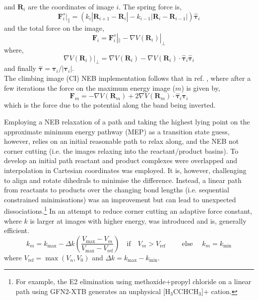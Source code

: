 \documentclass[../../main.tex]{subfiles}
\begin{document}
and $\boldsymbol{R}_i$ are the coordinates of image $i$. The spring force is,
\begin{equation}
	\boldsymbol{F}^s_i|_{\parallel} = (k_i|\boldsymbol{R}_{i+1} - \boldsymbol{R}_i| - k_{i-1}|\boldsymbol{R}_i - \boldsymbol{R}_{i-1}|) \hat{\boldsymbol{\tau}}_i
\end{equation}
and the total force on the image,
\begin{equation}
	\boldsymbol{F}_i = \boldsymbol{F}^s_i|_{\parallel} - \nabla V(\boldsymbol{R}_i)|_\perp
\end{equation}
where,
\begin{equation}
	\nabla V(\boldsymbol{R}_i)|_\perp = \nabla V(\boldsymbol{R}_i) - \nabla V(\boldsymbol{R}_i)\cdot \hat{\boldsymbol{\tau}}_i\hat{\boldsymbol{\tau}}_i
\end{equation}
and finally $\hat{\boldsymbol{\tau}} = \boldsymbol{\tau}_i/|\boldsymbol{\tau}_i|$.
\\
The climbing image (CI) NEB implementation follows that in ref. \cite{Henkelman2000CINEB}, where after a few iterations the force on the maximum energy image ($m$) is given by,
\begin{equation}
	\boldsymbol{F}_{m} = -\nabla V(\boldsymbol{R}_m) + 2\nabla V(\boldsymbol{R}_m)\cdot \hat{\boldsymbol{\tau}}_i\hat{\boldsymbol{\tau}}_i
\end{equation}
which is the force due to the potential along the band being inverted.

Employing a NEB relaxation of a path and taking the highest lying point on the approximate minimum energy pathway (MEP) as a transition state guess, however, relies on an initial reasonable path to relax along, and the NEB not corner cutting (i.e. the images relaxing into the reactant/product basins). To develop an initial path reactant and product complexes were overlapped and interpolation in Cartesian coordinates was employed. It is, however, challenging to align and rotate dihedrals to minimise the difference. Instead, a linear path from reactants to products over the changing bond lengths (i.e. sequential constrained minimisations) was an improvement but can lead to unexpected dissociations.\footnote{For example, the E2 elimination using methoxide+propyl chloride on a linear path using GFN2-XTB generates an unphysical [H$_3$CCHCH$_3$]+ cation.} In an attempt to reduce corner cutting an adaptive force constant, where $k$ is larger at images with higher energy, was introduced and is, generally  efficient.\cite{Henkelman2000NEB}
\begin{equation}
	k_m = 
		k_\text{max} - \Delta k \left(\frac{V_\text{max} - V_m}{V_\text{max} - V_\text{ref}} \right) \quad \text{if}\quad V_m > V_\text{ref} \qquad\text{  else  }\quad
		k_m = k_\text{min}  %
\label{equation::neb_adaptive_k}
\end{equation}
where $V_\text{ref} = \max(V_n, V_0)$ and $\Delta k = k_\text{max} - k_\text{min}$.
\end{document}
